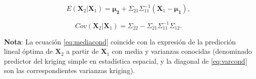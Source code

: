 \documentclass[
  spanish,
  10pt,
]{book}
\renewcommand{\boldsymbol}[1]{\symbf{#1}}
\renewcommand{\mathbf}[1]{\symbf{#1}}
\theoremstyle{break}
\theoremstyle{nonumberplain}
\begin{document}
\begin{equation}
E \left( \mathbf{X}_2 | \mathbf{X}_1 \right) = \boldsymbol{\mu_2} + \Sigma_{21} \Sigma_{11}^{-1}
\left(  \mathbf{X}_1 - \boldsymbol{\mu_1} \right), 
\label{eq:mediacond}
\end{equation}

\begin{equation}
Cov \left( \mathbf{X}_2 | \mathbf{X}_1 \right) =
\Sigma_{22} - \Sigma_{21} \Sigma_{11}^{-1} \Sigma_{12}.
\label{eq:varcond}
\end{equation}

\textbf{Nota}: La ecuación \eqref{eq:mediacond} coincide con la expresión de la predicción lineal óptima de \(\mathbf{X}_2\)
a partir de \(\mathbf{X}_1\) con media y varianzas conocidas (denominado predictor del kriging simple en estadística espacial, y la diagonal de \eqref{eq:varcond} son las correspondientes varianzas kriging).
\end{document}
